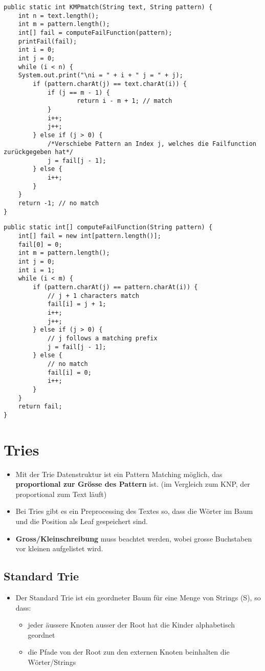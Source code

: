 \begin{lstlisting}[caption=Knuth-Morris-Pratt Algorithmus]
public static int KMPmatch(String text, String pattern) {
	int n = text.length();
	int m = pattern.length();
	int[] fail = computeFailFunction(pattern);
	printFail(fail);
	int i = 0;
	int j = 0;
	while (i < n) {
	System.out.print("\ni = " + i + " j = " + j);
		if (pattern.charAt(j) == text.charAt(i)) {
			if (j == m - 1) {
					return i - m + 1; // match
			}
			i++;
			j++;
		} else if (j > 0) {
			/*Verschiebe Pattern an Index j, welches die Failfunction zurückgegeben hat*/
			j = fail[j - 1];
		} else {
			i++;
		}
	}
	return -1; // no match
}
\end{lstlisting}


\begin{lstlisting}[caption=Knuth-Morris-Pratt Algorithmus Fehlfunktion]
public static int[] computeFailFunction(String pattern) {
	int[] fail = new int[pattern.length()];
	fail[0] = 0;
	int m = pattern.length();
	int j = 0;
	int i = 1;
	while (i < m) {
		if (pattern.charAt(j) == pattern.charAt(i)) {
			// j + 1 characters match
			fail[i] = j + 1;
			i++;
			j++;
		} else if (j > 0) {
			// j follows a matching prefix
			j = fail[j - 1];
	 	} else {
		 	// no match
			fail[i] = 0;
			i++;
		}
	}
	return fail;
}
\end{lstlisting}


\section{Tries}
\begin{itemize}
	\item Mit der Trie Datenstruktur ist ein Pattern Matching möglich, das \textbf{proportional zur Grösse des Pattern} ist. (im Vergleich zum KNP, der proportional zum Text läuft)
	\item Bei Tries gibt es ein Preprocessing des Textes so, dass die Wörter im Baum und die Position als Leaf gespeichert sind.
	\item \textbf{Gross/Kleinschreibung} muss beachtet werden, wobei grosse Buchstaben vor kleinen aufgelistet wird.
\end{itemize}

\subsection{Standard Trie}
\begin{itemize}
	\item Der Standard Trie ist ein geordneter Baum für eine Menge von Strings (S), so dass:
	\begin{itemize}
		\item jeder äussere Knoten ausser der Root hat die Kinder alphabetisch geordnet
		\item die Pfade von der Root zun den externen Knoten beinhalten die Wörter/Strings
	\end{itemize}
\end{itemize}

